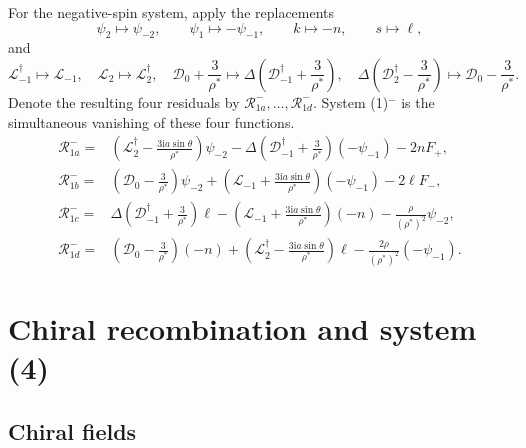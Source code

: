 \documentclass[11pt,a4paper]{article}
\numberwithin{equation}{section}
\theoremstyle{definition}
\theoremstyle{remark}
\newcommand{\I}{\mathrm i}
\newcommand{\D}{\mathcal D}
\newcommand{\Lop}{\mathcal L}
\newcommand{\Res}{\mathcal R}
\begin{document}
For the negative-spin system, apply the replacements
\begin{equation}
 \psi_2\mapsto\psi_{-2},\qquad
 \psi_1\mapsto-\psi_{-1},\qquad
 k\mapsto-n,\qquad s\mapsto\ell,
\label{eq:negativefields}
\end{equation}
and
\begin{equation}
 \Lop_{-1}^\dagger\mapsto\Lop_{-1},\quad
 \Lop_2\mapsto\Lop_2^\dagger,\quad
 \D_0+\frac3{\rho^*}\mapsto
 \Delta\left(\D_{-1}^\dagger+\frac3{\rho^*}\right),\quad
 \Delta\left(\D_2^\dagger-\frac3{\rho^*}\right)
 \mapsto\D_0-\frac3{\rho^*}.
\label{eq:negativeoperators}
\end{equation}
Denote the resulting four residuals by
\(\Res^-_{1a},\ldots,\Res^-_{1d}\).  System (1)\({}^-\) is the
simultaneous vanishing of these four functions.
\begin{align}
 \Res^-_{1a}={}&
 \left(\Lop_2^\dagger-\frac{3\I a\sin\theta}{\rho^*}\right)\psi_{-2}
 -\Delta\left(\D_{-1}^\dagger+\frac{3}{\rho^*}\right)(-\psi_{-1})
 -2nF_+,\label{eq:Rminus1a}\\
 \Res^-_{1b}={}&
 \left(\D_0-\frac{3}{\rho^*}\right)\psi_{-2}
 +\left(\Lop_{-1}+\frac{3\I a\sin\theta}{\rho^*}\right)(-\psi_{-1})
 -2\ell F_-,\label{eq:Rminus1b}\\
 \Res^-_{1c}={}&
 \Delta\left(\D_{-1}^\dagger+\frac{3}{\rho^*}\right)\ell
 -\left(\Lop_{-1}+\frac{3\I a\sin\theta}{\rho^*}\right)(-n)
 -\frac{\rho}{(\rho^*)^2}\psi_{-2},\label{eq:Rminus1c}\\
 \Res^-_{1d}={}&
 \left(\D_0-\frac{3}{\rho^*}\right)(-n)
 +\left(\Lop_2^\dagger-\frac{3\I a\sin\theta}{\rho^*}\right)\ell
 -\frac{2\rho}{(\rho^*)^2}(-\psi_{-1}).\label{eq:Rminus1d}
\end{align}

\section{Chiral recombination and system (4)}
\label{sec:chiral}

\subsection{Chiral fields}
\end{document}
